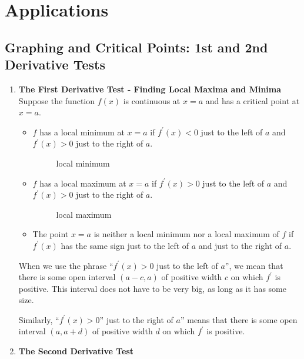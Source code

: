 \chapter{Applications}
\section{Graphing and Critical Points: 1st and 2nd Derivative Tests}
\begin{enumerate}
  \item\textbf{The First Derivative Test - Finding Local Maxima and Minima}\\
    \indent Suppose the function \(f(x)\) is continuous at \(x=a\) and has a critical point at \(x=a\).
    \begin{itemize}
      \item \(f\) has a local minimum at \(x=a\) if \(f^\prime (x)<0\) just to the left of \(a\) and \(f^\prime (x)>0\) just to the right of \(a\).
        \begin{figure}[H]
          \centering
          \caption{local minimum}
        \end{figure}
      \item \(f\) has a local maximum at \(x=a\) if \(f^\prime (x)>0\) just to the left of \(a\) and \(f^\prime (x)>0\) just to the right of \(a\).
        \begin{figure}[H]
          \centering
          \caption{local maximum}
        \end{figure}
      \item The point \(x=a\) is neither a local minimum nor a local maximum of \(f\) if \(f^\prime (x)\) has the same sign just to the left of \(a\) and just to the right of \(a\).
      \end{itemize}
      \begin{note}
        When we use the phrase ``\(f^\prime (x)>0\) just to the left of \(a\)'', we mean that there is some open interval \((a-c,a)\) of positive width \(c\) on which \(f^\prime\) is positive. This interval does not have to be very big, as long as it has some size.\par
        Similarly, ``\(f^\prime (x)>0\)'' just to the right of \(a\)'' means that there is some open interval \((a,a+d)\) of positive width \(d\) on which \(f^\prime\) is positive.
      \end{note}
  \item\textbf{The Second Derivative Test}\\

\end{enumerate}
